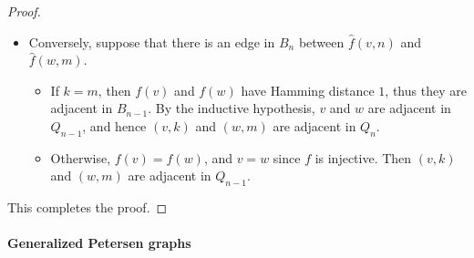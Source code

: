 \begin{proof}
\begin{itemize}
    \item Conversely, suppose that there is an edge in \( B_n \) between \( \widehat f(v, n) \) and \( \widehat f(w, m) \).
    \begin{itemize}
      \item If \( k = m \), then \( f(v) \) and \( f(w) \) have Hamming distance \( 1 \), thus they are adjacent in \( B_{n-1} \). By the inductive hypothesis, \( v \) and \( w \) are adjacent in \( Q_{n-1} \), and hence \( (v, k) \) and \( (w, m) \) are adjacent in \( Q_n \).

      \item Otherwise, \( f(v) = f(w) \), and \( v = w \) since \( f \) is injective. Then \( (v, k) \) and \( (w, m) \) are adjacent in \( Q_{n-1} \).
    \end{itemize}
  \end{itemize}

  This completes the proof.
\end{proof}

\paragraph{Generalized Petersen graphs}

